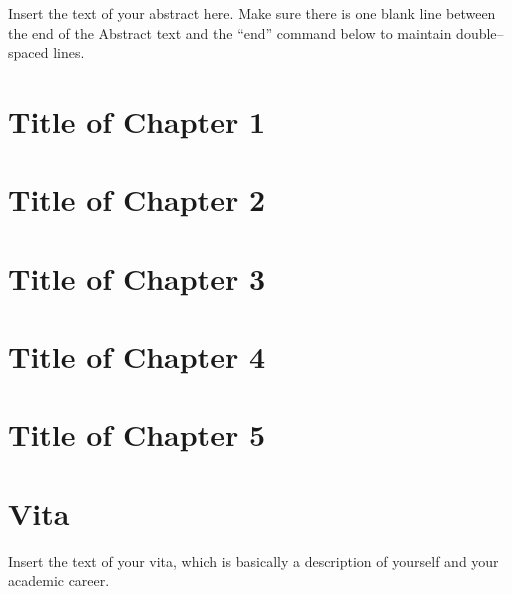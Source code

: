 \documentclass[12pt,letterpaper]{lsuetd}
\begin{document}
\renewenvironment{abstract}{{\hspace{-2.2em} \huge \textbf{\abstractname}} \par}{\pagebreak}
\begin{abstract}
\vspace{0.55ex}
\doublespacing
Insert the text of your abstract here.  Make sure there is one blank line between the end of the Abstract text and the ``end'' command below to maintain double--spaced lines.

\end{abstract}

\singlespacing
\setlength{\textfloatsep}{12pt plus 2pt minus 2pt}
\setlength{\intextsep}{6pt plus 2pt minus 2pt}
\chapter{Title of Chapter 1}
\doublespacing

\pagebreak
\singlespacing
\chapter{Title of Chapter 2}
\doublespacing

\pagebreak
\singlespacing
\chapter{Title of Chapter 3}
\doublespacing

\pagebreak
\singlespacing
\chapter{Title of Chapter 4}
\doublespacing

\pagebreak
\singlespacing
\chapter{Title of Chapter 5}
\doublespacing

\pagebreak
\singlespacing
\begin{thebibliography}{999}
\vspace{0.9em}

\end{thebibliography}
\pagebreak
\chapter*{Vita}
\doublespacing
\setlength{\parindent}{1.75em}
\vspace{0.2em}
Insert the text of your vita, which is basically a description of yourself and your academic career.
\end{document}
